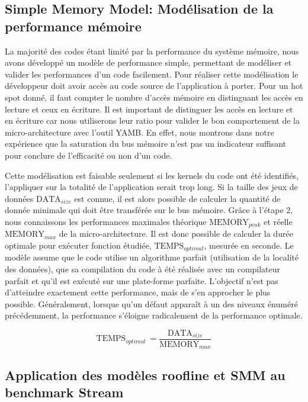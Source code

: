 \subsection{Simple Memory Model: Modélisation de la performance mémoire}

La majorité des codes étant limité par la performance du système mémoire, nous avons développé un modèle de performance simple, permettant de modéliser et valider les performances d'un code facilement. Pour réaliser cette modélisation le développeur doit avoir accès au code source de l'application à porter. Pour un hot spot donné, il faut compter le nombre d'accès mémoire en distinguant les accès en lecture et ceux en écriture. Il est important de distinguer les accès en lecture et en écriture car nous utiliserons leur ratio pour valider le bon comportement de la micro-architecture avec l'outil YAMB. En effet, nous montrons dans notre expérience que la saturation du bus mémoire n'est pas un indicateur suffisant pour conclure de l'efficacité ou non d'un code.

Cette modélisation est faisable seulement si les kernels du code ont été identifiés, l'appliquer sur la totalité de l'application serait trop long. Si la taille des jeux de données $\text{DATA}_{size}$ est connue, il est alors possible de calculer la quantité de donnée minimale qui doit être transférée sur le bus mémoire. Grâce à l'étape 2, nous connaissons les performances maximales théorique $\text{MEMORY}_{peak}$ et réelle $\text{MEMORY}_{max}$ de la micro-architecture. Il est donc possible de calculer la durée optimale pour exécuter fonction étudiée, $\text{TEMPS}_{optimal}$, mesurée en seconde. Le modèle assume que le code utilise un algorithme parfait (utilisation de la localité des données), que sa compilation du code à été réalisée avec un compilateur parfait et qu'il est exécuté sur une plate-forme parfaite. L'objectif n'est pas d'atteindre exactement cette performance, mais de s'en approcher le plus possible. Généralement, lorsque qu'un défaut apparaît à un des niveaux énuméré précédemment, la performance s'éloigne radicalement de la performance optimale.

\begin{equation}
    \text{TEMPS}_{optimal}\ = \frac{\text{DATA}_{size}}{\text{MEMORY}_{max}}
\end{equation}





\subsection{Application des modèles roofline et SMM au benchmark Stream}

